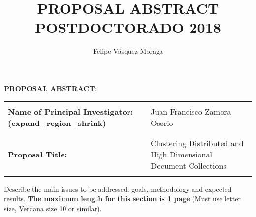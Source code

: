 \documentclass[10pt]{article}
\author{Felipe Vásquez Moraga}
\title{PROPOSAL ABSTRACT POSTDOCTORADO 2018}
\begin{document}
\noindent \textbf{PROPOSAL ABSTRACT:}

\noindent \textbf{}

\begin{tabular}{|p{2.3in}|p{4.7in}|}
\hline
\parbox{2.3in}{\centering }
& \parbox{4.7in} {\centering }  \\

\parbox{2.3in} {\raggedright\textbf{Name of Principal Investigator: (expand\_region\_shrink)}}
& \parbox{4.7in} {\centering }  Juan  Francisco Zamora Osorio\\ 

\parbox{2.3in}{\centering }
& \parbox{4.7in} {\centering }  \\
\hline 
\parbox{2.3in}{\centering }
& \parbox{4.7in} {\centering }  \\
\parbox{2.3in} {\raggedright\textbf{Proposal Title:} }
& \parbox{4.7in} {\centering }  Clustering  Distributed and High Dimensional Document Collections\\
\parbox{2.3in}{\centering }
& \parbox{4.7in} {\centering }  \\
\hline 
\end{tabular}


\vspace{15pt}
\noindent Describe the main issues to be addressed: goals, methodology and expected results. \textbf{The maximum length for this section is 1 page } (Must use letter size, Verdana size 10 or similar).


\end{document}
